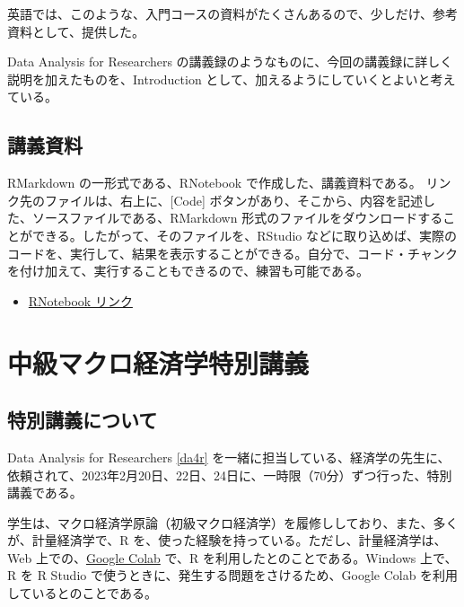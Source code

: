 \documentclass[
]{book}
\providecommand{\tightlist}{%
  \setlength{\itemsep}{0pt}\setlength{\parskip}{0pt}}
\theoremstyle{definition}
\theoremstyle{definition}
\theoremstyle{definition}
\theoremstyle{definition}
\theoremstyle{remark}
\begin{document}
英語では、このような、入門コースの資料がたくさんあるので、少しだけ、参考資料として、提供した。

Data Analysis for Researchers の講義録のようなものに、今回の講義録に詳しく説明を加えたものを、Introduction として、加えるようにしていくとよいと考えている。

\hypertarget{ux8b1bux7fa9ux8cc7ux6599}{%
\section{講義資料}\label{ux8b1bux7fa9ux8cc7ux6599}}

RMarkdown の一形式である、RNotebook で作成した、講義資料である。
リンク先のファイルは、右上に、{[}Code{]} ボタンがあり、そこから、内容を記述した、ソースファイルである、RMarkdown 形式のファイルをダウンロードすることができる。したがって、そのファイルを、RStudio などに取り込めば、実際のコードを、実行して、結果を表示することができる。自分で、コード・チャンクを付け加えて、実行することもできるので、練習も可能である。

\begin{itemize}
\tightlist
\item
  \href{https://ds-sl.github.io/intro2r/intro2r.nb.html}{RNotebook リンク}
\end{itemize}

\hypertarget{eco232}{%
\chapter{中級マクロ経済学特別講義}\label{eco232}}

\hypertarget{ux7279ux5225ux8b1bux7fa9ux306bux3064ux3044ux3066}{%
\section{特別講義について}\label{ux7279ux5225ux8b1bux7fa9ux306bux3064ux3044ux3066}}

Data Analysis for Researchers \ref{da4r} を一緒に担当している、経済学の先生に、依頼されて、2023年2月20日、22日、24日に、一時限（70分）ずつ行った、特別講義である。

学生は、マクロ経済学原論（初級マクロ経済学）を履修ししており、また、多くが、計量経済学で、R を、使った経験を持っている。ただし、計量経済学は、Web 上での、\href{https://research.google.com/colaboratory/faq.html}{Google Colab} で、R を利用したとのことである。Windows 上で、R を R Studio で使うときに、発生する問題をさけるため、Google Colab を利用しているとのことである。
\end{document}
